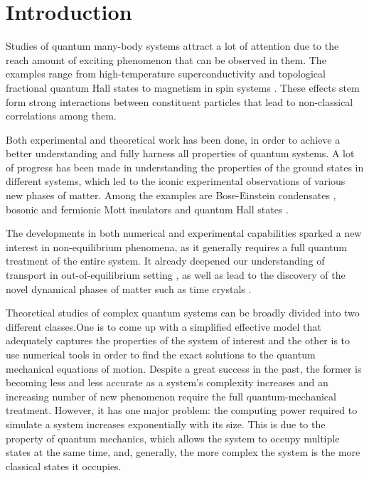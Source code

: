 \chapter{Introduction}
\label{introduction}

Studies of quantum many-body systems attract a lot of attention due to the reach amount of exciting phenomenon that can be observed in them. The examples range from high-temperature superconductivity \cite{Rev. Mod. Phys. 78, 17 (2006)} and topological fractional quantum Hall states \cite{Rev. Mod. Phys. 71, S298 (1999)} to magnetism in spin systems \cite{. Auerbach, Interacting Electrons and Quantum Magnetism (Springer, 1994)}. These effects stem form strong interactions between constituent particles that lead to non-classical correlations among them.

Both experimental and theoretical work has been done, in order to achieve a better understanding and fully harness all properties of quantum systems. A lot of progress has been made in understanding the properties of the ground states in different systems, which led to the iconic experimental observations of various new phases of matter. Among the examples are Bose-Einstein condensates \cite{wolfang, cornell}, bosonic \cite{Greiner2002} and fermionic \cite{tilman} Mott insulators and quantum Hall states \cite{quantum hall}. 

The developments in both numerical and experimental capabilities sparked a new interest in non-equilibrium phenomena, as it generally requires a full quantum treatment of the entire system. It already deepened our understanding of transport in out-of-equilibrium setting \cite{tilman}, as well as lead to the discovery of the novel dynamical phases of matter such as time crystals \cite{mich monroe}.

Theoretical studies of complex quantum systems can be broadly divided into two different classes.One is to come up with a simplified effective model that adequately captures the properties of the system of interest and the other is to use numerical tools in order to find the exact solutions to the quantum mechanical equations of motion. Despite a great success in the past, the former is becoming less and less accurate as a system's complexity increases and an increasing number of new phenomenon require the full quantum-mechanical treatment. However, it has one major problem: the computing power required to simulate a system increases exponentially with its size. This is due to the property of quantum mechanics, which allows the system to occupy multiple states at the same time, and, generally, the more complex the system is the more classical states it occupies.

